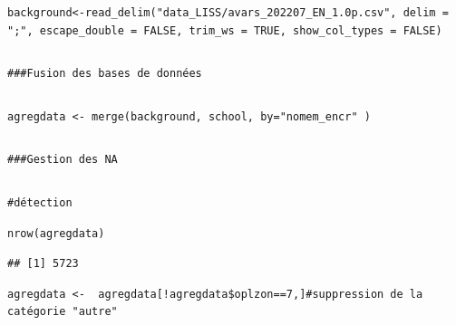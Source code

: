 \documentclass[a4paper, french, 11 pt]{article}\usepackage[]{graphicx}\usepackage[]{xcolor}
\makeatletter
\newenvironment{kframe}{%
 \def\at@end@of@kframe{}%
 \ifinner\ifhmode%
  \def\at@end@of@kframe{\end{minipage}}%
  \begin{minipage}{\columnwidth}%
 \fi\fi%
 \def\FrameCommand##1{\hskip\@totalleftmargin \hskip-\fboxsep
 \colorbox{shadecolor}{##1}\hskip-\fboxsep
     \hskip-\linewidth \hskip-\@totalleftmargin \hskip\columnwidth}%
 \MakeFramed {\advance\hsize-\width
   \@totalleftmargin\z@ \linewidth\hsize
   \@setminipage}}%
 {\par\unskip\endMakeFramed%
 \at@end@of@kframe}
\newenvironment{knitrout}{}{} %
\makeatother
\begin{document}
\begin{knitrout}
\begin{kframe}
{\ttfamily\noindent\color{warningcolor}{\#\# Warning: One or more parsing issues, call `problems()` on your data\\\#\# frame for details, e.g.:\\\#\# \ \ dat <- vroom(...)\\\#\# \ \ problems(dat)}}\begin{lstlisting}[basicstyle=\ttfamily,breaklines=true]
background<-read_delim("data_LISS/avars_202207_EN_1.0p.csv", delim = ";", escape_double = FALSE, trim_ws = TRUE, show_col_types = FALSE)\end{lstlisting}
\begin{lstlisting}[basicstyle=\ttfamily,breaklines=true]
\end{lstlisting}
\begin{lstlisting}[basicstyle=\ttfamily,breaklines=true]
###Fusion des bases de données\end{lstlisting}
\begin{lstlisting}[basicstyle=\ttfamily,breaklines=true]
\end{lstlisting}
\begin{lstlisting}[basicstyle=\ttfamily,breaklines=true]
agregdata <- merge(background, school, by="nomem_encr" )\end{lstlisting}
\begin{lstlisting}[basicstyle=\ttfamily,breaklines=true]
\end{lstlisting}
\begin{lstlisting}[basicstyle=\ttfamily,breaklines=true]
###Gestion des NA\end{lstlisting}
\begin{lstlisting}[basicstyle=\ttfamily,breaklines=true]
\end{lstlisting}
\begin{lstlisting}[basicstyle=\ttfamily,breaklines=true]
#détection\end{lstlisting}
\begin{lstlisting}[basicstyle=\ttfamily,breaklines=true]
nrow(agregdata)\end{lstlisting}
\begin{lstlisting}[basicstyle=\ttfamily,breaklines=true]
## [1] 5723
\end{lstlisting}
\begin{lstlisting}[basicstyle=\ttfamily,breaklines=true]
agregdata <-  agregdata[!agregdata$oplzon==7,]#suppression de la catégorie "autre"\end{lstlisting}
\begin{lstlisting}[basicstyle=\ttfamily,breaklines=true]

\end{lstlisting}
\end{kframe}
\end{knitrout}
\end{document}
